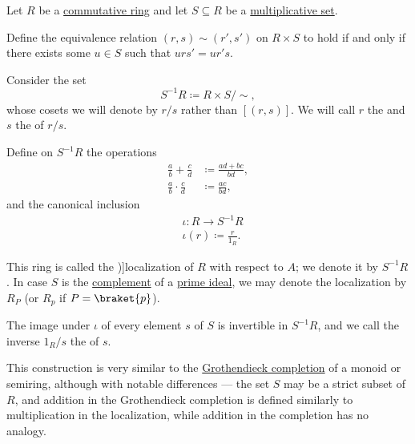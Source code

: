 \begin{definition}\label{def:ring_localization}
  Let \( R \) be a \hyperref[def:ring/commutative]{commutative ring} and let \( S \subseteq R \) be a \hyperref[def:multiplicative_set_in_ring]{multiplicative set}.

  Define the equivalence relation \( (r, s) \sim (r', s') \) on \( R \times S \) to hold if and only if there exists some \( u \in S \) such that \( u r s' = u r' s \).

  Consider the set
  \begin{equation*}
    S^{-1} R \coloneqq R \times S / {\sim},
  \end{equation*}
  whose cosets we will denote by \( r / s \) rather than \( [(r, s)] \). We will call \( r \) the  and \( s \) the  of \( r / s \).

  Define on \( S^{-1} R \) the operations
  \begin{align*}
    \frac a b + \frac c d     &\coloneqq \frac {a d + b c} {b d}, \\
    \frac a b \cdot \frac c d &\coloneqq \frac {a c} {b d},
  \end{align*}
  and the canonical inclusion
  \begin{equation*}
    \begin{aligned}
      &\iota: R \to S^{-1} R \\
      &\iota(r) \coloneqq \frac r {1_R}.
    \end{aligned}
  \end{equation*}

  This ring is called the \term[bg=локализация (\cite[23]{КоцевСидеров2016КомАлгебра})]{localization} of \( R \) with respect to \( A \); we denote it by \( S^{-1} R \). In case \( S \) is the \hyperref[thm:boolean_algebra_of_subsets/complement]{complement} of a \hyperref[def:semiring_ideal/prime]{prime ideal}, we may denote the localization by \( R_P \) (or \( R_p \) if \( P = \braket{ p } \)).

  The image under \( \iota \) of every element \( s \) of \( S \) is invertible in \( S^{-1} R \), and we call the inverse \( 1_R / s \) the  of \( s \).
\end{definition}
\begin{comments}
  \item This construction is very similar to the \hyperref[def:monoid_grothendieck_completion]{Grothendieck completion} of a monoid or semiring, although with notable differences --- the set \( S \) may be a strict subset of \( R \), and addition in the Grothendieck completion is defined similarly to multiplication in the localization, while addition in the completion has no analogy.
\end{comments}
